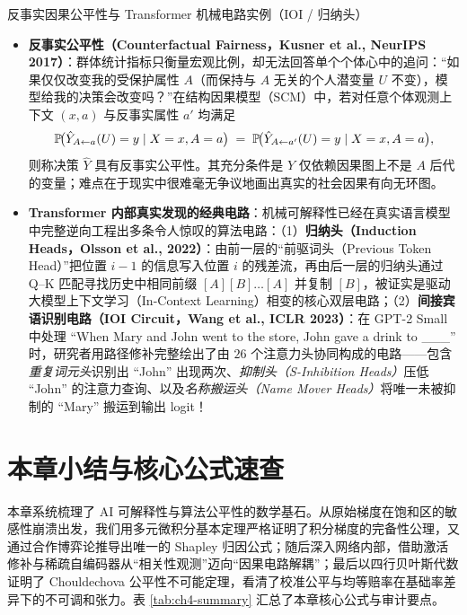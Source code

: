 \begin{extBox}{反事实因果公平性与 Transformer 机械电路实例（IOI / 归纳头）}
\begin{itemize}
  \item \textbf{反事实公平性（Counterfactual Fairness，Kusner et al., NeurIPS 2017）}：群体统计指标只衡量宏观比例，却无法回答单个个体心中的追问：“如果仅仅改变我的受保护属性 $A$（而保持与 $A$ 无关的个人潜变量 $U$ 不变），模型给我的决策会改变吗？”在结构因果模型（SCM）中，若对任意个体观测上下文 $(x, a)$ 与反事实属性 $a'$ 均满足
  \[
    \mathbb{P}\!\big(\hat{Y}_{A \leftarrow a}(U) = y \mid X=x, A=a\big) \;=\; \mathbb{P}\!\big(\hat{Y}_{A \leftarrow a'}(U) = y \mid X=x, A=a\big),
  \]
  则称决策 $\hat{Y}$ 具有反事实公平性。其充分条件是 $\hat{Y}$ 仅依赖因果图上不是 $A$ 后代的变量；难点在于现实中很难毫无争议地画出真实的社会因果有向无环图。
  \item \textbf{Transformer 内部真实发现的经典电路}：机械可解释性已经在真实语言模型中完整逆向工程出多条令人惊叹的算法电路：（1）\textbf{归纳头（Induction Heads，Olsson et al., 2022）}：由前一层的“前驱词头（Previous Token Head）”把位置 $i-1$ 的信息写入位置 $i$ 的残差流，再由后一层的归纳头通过 Q--K 匹配寻找历史中相同前缀 $[A][B]\dots[A]$ 并复制 $[B]$，被证实是驱动大模型上下文学习（In-Context Learning）相变的核心双层电路；（2）\textbf{间接宾语识别电路（IOI Circuit，Wang et al., ICLR 2023）}：在 GPT-2 Small 中处理 ``When Mary and John went to the store, John gave a drink to \_\_\_'' 时，研究者用路径修补完整绘出了由 $26$ 个注意力头协同构成的电路——包含\emph{重复词元头}识别出 ``John'' 出现两次、\emph{抑制头（S-Inhibition Heads）}压低 ``John'' 的注意力查询、以及\emph{名称搬运头（Name Mover Heads）}将唯一未被抑制的 ``Mary'' 搬运到输出 logit！
\end{itemize}
\end{extBox}

\section{本章小结与核心公式速查}

本章系统梳理了 AI 可解释性与算法公平性的数学基石。从原始梯度在饱和区的敏感性崩溃出发，我们用多元微积分基本定理严格证明了积分梯度的完备性公理，又通过合作博弈论推导出唯一的 Shapley 归因公式；随后深入网络内部，借助激活修补与稀疏自编码器从“相关性观测”迈向“因果电路解耦”；最后以四行贝叶斯代数证明了 Chouldechova 公平性不可能定理，看清了校准公平与均等赔率在基础率差异下的不可调和张力。表 \ref{tab:ch4-summary} 汇总了本章核心公式与审计要点。

